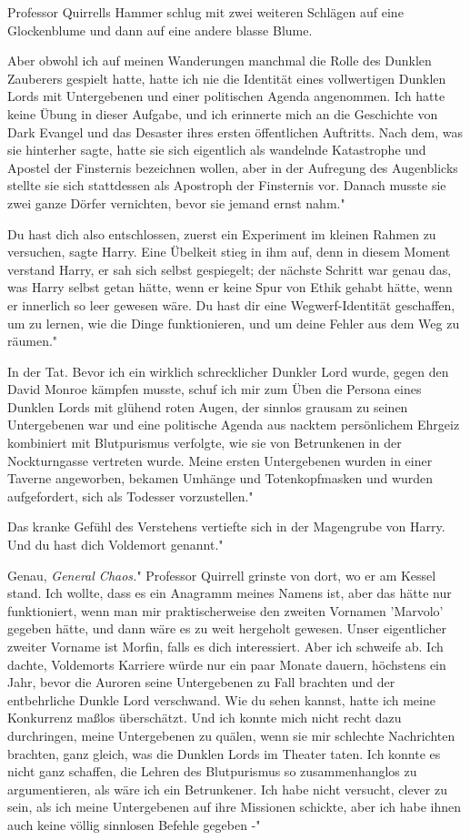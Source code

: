 Professor Quirrells Hammer schlug mit zwei weiteren Schlägen auf eine
Glockenblume und dann auf eine andere blasse Blume.

\glqq{}Aber obwohl ich auf meinen Wanderungen manchmal die Rolle des Dunklen
Zauberers gespielt hatte, hatte ich nie die Identität eines vollwertigen Dunklen
Lords mit Untergebenen und einer politischen Agenda angenommen. Ich hatte keine
Übung in dieser Aufgabe, und ich erinnerte mich an die Geschichte von Dark
Evangel und das Desaster ihres ersten öffentlichen Auftritts. Nach dem, was sie
hinterher sagte, hatte sie sich eigentlich als wandelnde Katastrophe und Apostel
der Finsternis bezeichnen wollen, aber in der Aufregung des Augenblicks stellte
sie sich stattdessen als Apostroph der Finsternis vor. Danach musste sie zwei
ganze Dörfer vernichten, bevor sie jemand ernst nahm."

\glqq{}Du hast dich also entschlossen, zuerst ein Experiment im kleinen Rahmen zu
versuchen\grqq{}, sagte Harry. Eine Übelkeit stieg in ihm auf, denn in diesem
Moment verstand Harry, er sah sich selbst gespiegelt; der nächste Schritt war
genau das, was Harry selbst getan hätte, wenn er keine Spur von Ethik gehabt
hätte, wenn er innerlich so leer gewesen wäre. \glqq{}Du hast dir eine
Wegwerf-Identität geschaffen, um zu lernen, wie die Dinge funktionieren, und um
deine Fehler aus dem Weg zu räumen."

\glqq{}In der Tat. Bevor ich ein wirklich schrecklicher Dunkler Lord wurde, gegen
den David Monroe kämpfen musste, schuf ich mir zum Üben die Persona eines
Dunklen Lords mit glühend roten Augen, der sinnlos grausam zu seinen
Untergebenen war und eine politische Agenda aus nacktem persönlichem Ehrgeiz
kombiniert mit Blutpurismus verfolgte, wie sie von Betrunkenen in der
Nockturngasse vertreten wurde. Meine ersten Untergebenen wurden in einer Taverne
angeworben, bekamen Umhänge und Totenkopfmasken und wurden aufgefordert, sich
als Todesser vorzustellen."

Das kranke Gefühl des Verstehens vertiefte sich in der Magengrube von Harry.
\glqq{}Und du hast dich Voldemort genannt."

\glqq{}Genau, \emph{General Chaos.}" Professor Quirrell grinste von dort, wo er
am Kessel stand. \glqq{}Ich wollte, dass es ein Anagramm meines Namens ist, aber
das hätte nur funktioniert, wenn man mir praktischerweise den zweiten Vornamen
'Marvolo' gegeben hätte, und dann wäre es zu weit hergeholt gewesen. Unser
eigentlicher zweiter Vorname ist Morfin, falls es dich interessiert. Aber ich
schweife ab. Ich dachte, Voldemorts Karriere würde nur ein paar Monate dauern,
höchstens ein Jahr, bevor die Auroren seine Untergebenen zu Fall brachten und
der entbehrliche Dunkle Lord verschwand. Wie du sehen kannst, hatte ich meine
Konkurrenz maßlos überschätzt. Und ich konnte mich nicht recht dazu durchringen,
meine Untergebenen zu quälen, wenn sie mir schlechte Nachrichten brachten, ganz
gleich, was die Dunklen Lords im Theater taten. Ich konnte es nicht ganz
schaffen, die Lehren des Blutpurismus so zusammenhanglos zu argumentieren, als
wäre ich ein Betrunkener. Ich habe nicht versucht, clever zu sein, als ich meine
Untergebenen auf ihre Missionen schickte, aber ich habe ihnen auch keine völlig
sinnlosen Befehle gegeben -"


